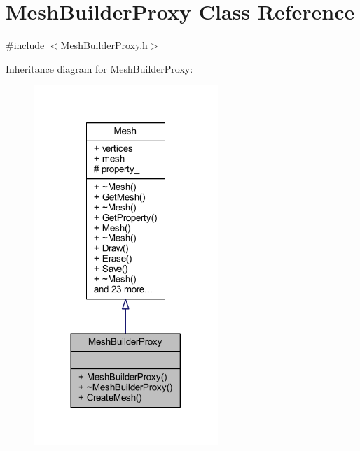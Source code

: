\hypertarget{class_mesh_builder_proxy}{}\section{Mesh\+Builder\+Proxy Class Reference}
\label{class_mesh_builder_proxy}


{\ttfamily \#include $<$Mesh\+Builder\+Proxy.\+h$>$}



Inheritance diagram for Mesh\+Builder\+Proxy\+:
\nopagebreak
\begin{figure}[H]
\begin{center}
\leavevmode
\includegraphics[width=197pt]{class_mesh_builder_proxy__inherit__graph}
\end{center}
\end{figure}


